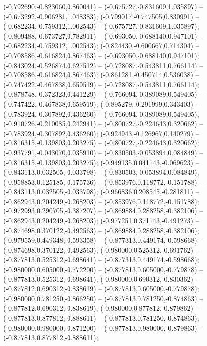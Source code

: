  (-0.792690,-0.823060,0.860041) -- (-0.675727,-0.831609,1.035897) -- (-0.673292,-0.906281,1.048383);
 (-0.799017,-0.747505,0.830991) -- (-0.682234,-0.759312,1.002543) -- (-0.675727,-0.831609,1.035897);
 (-0.809488,-0.673727,0.782911) -- (-0.693050,-0.688140,0.947101) -- (-0.682234,-0.759312,1.002543);
 (-0.824430,-0.600667,0.714304) -- (-0.708586,-0.616824,0.867463) -- (-0.693050,-0.688140,0.947101);
 (-0.843024,-0.526874,0.627512) -- (-0.728087,-0.543811,0.766114) -- (-0.708586,-0.616824,0.867463);
 (-0.861281,-0.450714,0.536038) -- (-0.747422,-0.467838,0.659519) -- (-0.728087,-0.543811,0.766114);
 (-0.878748,-0.372323,0.441229) -- (-0.766094,-0.389089,0.549405) -- (-0.747422,-0.467838,0.659519);
 (-0.895279,-0.291999,0.343403) -- (-0.783924,-0.307892,0.436260) -- (-0.766094,-0.389089,0.549405);
 (-0.910726,-0.210085,0.242941) -- (-0.800727,-0.224643,0.320662) -- (-0.783924,-0.307892,0.436260);
 (-0.924943,-0.126967,0.140279) -- (-0.816315,-0.139803,0.203275) -- (-0.800727,-0.224643,0.320662);
 (-0.937791,-0.043070,0.035910) -- (-0.830503,-0.053894,0.084849) -- (-0.816315,-0.139803,0.203275);
 (-0.949135,0.041143,-0.069623) -- (-0.843113,0.032505,-0.033798) -- (-0.830503,-0.053894,0.084849);
 (-0.958853,0.125185,-0.175736) -- (-0.853976,0.118772,-0.151788) -- (-0.843113,0.032505,-0.033798);
 (-0.966836,0.208545,-0.281811) -- (-0.862943,0.204249,-0.268203) -- (-0.853976,0.118772,-0.151788);
 (-0.972993,0.290705,-0.387207) -- (-0.869884,0.288258,-0.382106) -- (-0.862943,0.204249,-0.268203);
 (-0.977251,0.371143,-0.491273) -- (-0.874698,0.370122,-0.492563) -- (-0.869884,0.288258,-0.382106);
 (-0.979559,0.449348,-0.593358) -- (-0.877313,0.449174,-0.598668) -- (-0.874698,0.370122,-0.492563);
 (-0.980000,0.525312,-0.691762) -- (-0.877813,0.525312,-0.698641) -- (-0.877313,0.449174,-0.598668);
 (-0.980000,0.605000,-0.772200) -- (-0.877813,0.605000,-0.779878) -- (-0.877813,0.525312,-0.698641);
 (-0.980000,0.690312,-0.830362) -- (-0.877812,0.690312,-0.838619) -- (-0.877813,0.605000,-0.779878);
 (-0.980000,0.781250,-0.866250) -- (-0.877813,0.781250,-0.874863) -- (-0.877812,0.690312,-0.838619);
 (-0.980000,0.877812,-0.879862) -- (-0.877813,0.877812,-0.888611) -- (-0.877813,0.781250,-0.874863);
 (-0.980000,0.980000,-0.871200) -- (-0.877813,0.980000,-0.879863) -- (-0.877813,0.877812,-0.888611);
